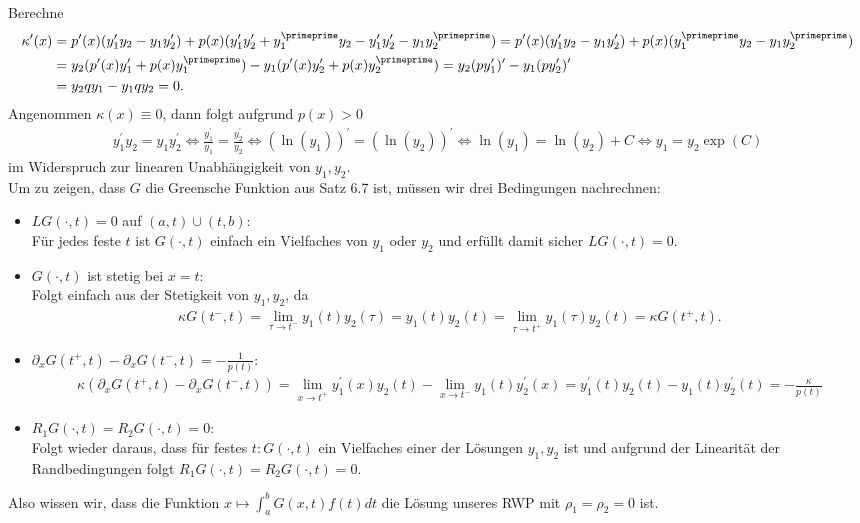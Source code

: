 \begin{solution}
Berechne
\begin{align*}
  \kappa^{\prime}(x) &= p^{\prime}(x)(y_1^{\prime}y_2 - y_1y_2^{\prime})
  + p(x)(y_1^{\prime}y_2^{\prime} + y_1^{\primeprime}y_2 - y_1^{\prime}y_2^{\prime} - y_1y_2^{\primeprime})
  = p^{\prime}(x)(y_1^{\prime}y_2 - y_1y_2^{\prime})
  + p(x)(y_1^{\primeprime}y_2  - y_1y_2^{\primeprime}) \\
  &= y_2(p^{\prime}(x)y_1^{\prime} + p(x)y_1^{\primeprime}) -
  y_1(p^{\prime}(x)y_2^{\prime} + p(x)y_2^{\primeprime})
  = y_2(py_1^{\prime})^{\prime} - y_1(py_2^{\prime})^{\prime} \\
  &= y_2qy_1 - y_1qy_2 = 0.
\end{align*}
Angenommen $\kappa(x) \equiv 0$, dann folgt aufgrund $p(x) > 0$
\begin{align*}
  y_1^{\prime}y_2 = y_1y_2^{\prime} \iff
  \frac{y_1^{\prime}}{y_1} = \frac{y_2^{\prime}}{y_2} \iff
  (\ln(y_1))^{\prime} = (\ln(y_2))^{\prime} \iff
  \ln(y_1) = \ln(y_2) + C \iff
  y_1 = y_2\exp(C)
\end{align*}
im Widerspruch zur linearen Unabhängigkeit von $y_1,y_2$. \\
Um zu zeigen, dass $G$ die Greensche Funktion aus Satz 6.7 ist, müssen wir drei
Bedingungen nachrechnen:
\begin{itemize}
  \item $LG(\cdot,t) = 0$ auf $(a,t) \cup (t,b)$: \\ Für jedes feste $t$ ist $G(\cdot,t)$
  einfach ein Vielfaches von $y_1$ oder $y_2$ und erfüllt damit sicher $LG(\cdot,t) = 0$.
  \item $G(\cdot,t)$ ist stetig bei $x = t$: \\
  Folgt einfach aus der Stetigkeit von $y_1,y_2$, da
  \begin{align*}
    \kappa G(t^-,t) = \lim_{\tau \to t^-}y_1(t)y_2(\tau) = y_1(t)y_2(t)
    = \lim_{\tau \to t^+}y_1(\tau)y_2(t) = \kappa G(t^+,t).
  \end{align*}
  \item $\partial_x G(t^+,t)- \partial_x G(t^-,t) = - \frac{1}{p(t)}$:
  \begin{align*}
    \kappa(\partial_x G(t^+,t)- \partial_x G(t^-,t)) =
    \lim_{x \to t^+}y_1^{\prime}(x)y_2(t)- \lim_{x \to t^-}y_1(t)y_2^{\prime}(x)
    = y_1^{\prime}(t)y_2(t) - y_1(t)y_2^{\prime}(t) = - \frac{\kappa}{p(t)}
  \end{align*}
  \item $R_1G(\cdot,t) = R_2G(\cdot,t) = 0$: \\
  Folgt wieder daraus, dass für festes $t: G(\cdot,t)$ ein Vielfaches einer
   der Lösungen $y_1,y_2$ ist und aufgrund der Linearität der Randbedingungen
   folgt $R_1G(\cdot,t) = R_2G(\cdot,t) = 0$.
\end{itemize}
Also wissen wir, dass die Funktion $x \mapsto \int_a^b G(x,t)f(t) dt$ die Lösung
unseres RWP mit $\rho_1 = \rho_2 = 0$ ist.
\end{solution}
